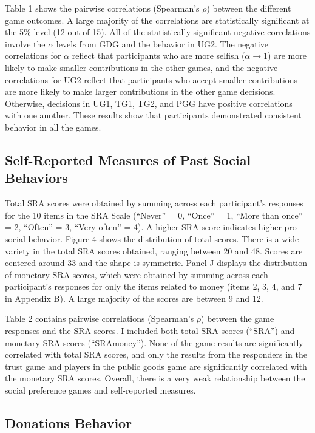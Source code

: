 \documentclass[12pt]{article}
\begin{document}
Table 1 shows the pairwise correlations (Spearman\rq s \(\rho\)) between the different game outcomes. A large majority of the correlations are statistically significant at the 5\% level (12 out of 15). All of the statistically significant negative correlations involve the \(\alpha\) levels from GDG and the behavior in UG2. The negative correlations for \(\alpha\) reflect that participants who are more selfish (\(\alpha \rightarrow 1\)) are more likely to make smaller contributions in the other games, and the negative correlations for UG2 reflect that participants who accept smaller contributions are more likely to make larger contributions in the other game decisions. Otherwise, decisions in UG1, TG1, TG2, and PGG have positive correlations with one another.
These results show that participants demonstrated consistent behavior in all the games.

\subsection{Self-Reported Measures of Past Social Behaviors}

Total SRA scores were obtained by summing across each participant\rq s responses for the 10 items in the SRA Scale (``Never'' = 0, ``Once'' = 1, ``More than once'' = 2, ``Often'' = 3, ``Very often'' = 4). A higher SRA score indicates higher pro-social behavior. Figure 4 shows the distribution of total scores. There is a wide variety in the total SRA scores obtained, ranging between 20 and 48. Scores are centered around 33 and the shape is symmetric. Panel J displays the distribution of monetary SRA scores, which were obtained by summing across each participant\rq s responses for only the items related to money (items 2, 3, 4, and 7 in Appendix B).  A large majority of the scores are between 9 and 12.

Table 2 contains pairwise correlations (Spearman\rq s \(\rho\)) between the game responses and the SRA scores. I included both total SRA scores (``SRA'') and monetary SRA scores (``SRAmoney''). None of the game results are significantly correlated with total SRA scores, and only the results from the responders in the trust game and players in the public goods game are significantly correlated with the monetary SRA scores. Overall, there is a very weak relationship between the social preference games and self-reported measures. 

\subsection{Donations Behavior}
\end{document}
